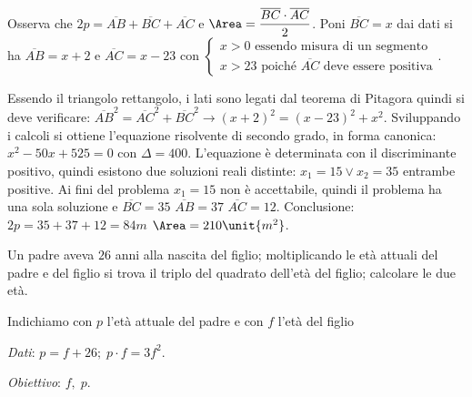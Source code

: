 \begin{soluzione}

Osserva che \(2 p = \overline {AB} +\overline {BC} +\overline {AC}\) e 
\(\Area 
=\dfrac{\overline {BC} \cdot \overline {AC}}{2}\).
Poni \(\overline {BC} = x\) dai dati si ha \(\overline {AB} = x +2\) e 
\(\overline{AC} = x -23\) con
\(\left\{\begin{array}{l} x > 0 \text{ essendo misura di un segmento} \\x >23 
\text{ poiché } \overline {AC} \text{ deve essere positiva}
\end{array}\right.\).

Essendo il triangolo rettangolo, i lati sono legati dal teorema di Pitagora
quindi si deve verificare: \(\overline {AB}^{2}= \overline {AC}^{2} +\overline 
{BC}^{2}\rightarrow ( x +2 )^{2} = ( x -23 )^{2} +x^2\). Sviluppando i 
calcoli si ottiene l'equazione risolvente di secondo grado, in forma canonica: 
\(x^2 -50 x +525 = 0 \text{ con } \Delta = 400\). L'equazione è determinata 
con il discriminante positivo, quindi esistono due soluzioni reali distinte: 
\(x_1 = 15 \vee x_2 = 35\) entrambe positive. Ai fini del problema \(x_1 
= 
15\) non è accettabile, quindi il problema ha una sola soluzione e \(\overline 
{BC} = 35\) \(\overline {AB} = 37\) \(\overline {AC} = 12\). Conclusione: \(2 p 
= 35 
+
37 +12 = 84\unit{m}\) \( \Area = 210\unit{m^{2}}\).
\end{soluzione}

\begin{problema}
Un padre aveva \(26\) anni alla nascita del figlio; moltiplicando le età 
attuali 
del padre e del figlio si trova il triplo del quadrato dell'età del figlio; 
calcolare le due età.
\end{problema}
Indichiamo con \(p\) l'età attuale del padre e con \(f\) l'età del figlio

\emph{Dati}: \(p = f +26;\; p \cdot f = 3 f^{2}\).

\emph{Obiettivo}: \(f,\; p\).

